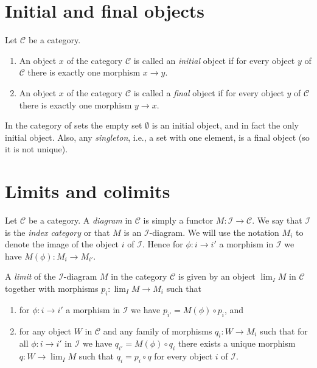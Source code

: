 \section{Initial and final objects}
\label{section-initial-final}

\begin{definition}
\label{definition-initial-final}
Let $\mathcal{C}$ be a category.
\begin{enumerate}
\item An object $x$ of the category $\mathcal{C}$ is called
an {\it initial} object if for every object $y$ of $\mathcal{C}$
there is exactly one morphism $x \to y$.
\item An object $x$ of the category $\mathcal{C}$ is called
a {\it final} object if for every object $y$ of $\mathcal{C}$
there is exactly one morphism $y \to x$.
\end{enumerate}
\end{definition}

\noindent
In the category of sets the empty set $\emptyset$ is an
initial object, and in fact the only initial object.
Also, any {\it singleton}, i.e., a set with one element,
is a final object (so it is not unique).

\section{Limits and colimits}
\label{section-limits}

\noindent
Let $\mathcal{C}$ be a category. A {\it diagram} in $\mathcal{C}$ is
simply a functor $M : \mathcal{I} \to \mathcal{C}$. We say that
$\mathcal{I}$ is the {\it index category} or that $M$ is an
$\mathcal{I}$-diagram. We will use the notation $M_i$ to denote the
image of the object
$i$ of $\mathcal{I}$. Hence for $\phi : i \to i'$ a morphism
in $\mathcal{I}$ we have $M(\phi) : M_i \to M_{i'}$.

\begin{definition}
\label{definition-limit}
A {\it limit} of the $\mathcal{I}$-diagram $M$ in the category
$\mathcal{C}$ is given by an object $\lim_I M$ in $\mathcal{C}$
together with morphisms $p_i : \lim_I M \to M_i$ such that
\begin{enumerate}
\item for $\phi : i \to i'$ a morphism
in $\mathcal{I}$ we have $p_{i'} =  M(\phi) \circ p_i$, and
\item for any object $W$ in $\mathcal{C}$ and any family of
morphisms $q_i : W \to M_i$ such that for all $\phi : i \to i'$
in $\mathcal{I}$ we have $q_{i'} = M(\phi) \circ q_i$ there
exists a unique morphism $q : W \to \lim_I M$ such that
$q_i = p_i \circ q$ for every object $i$ of $\mathcal{I}$.
\end{enumerate}
\end{definition}

